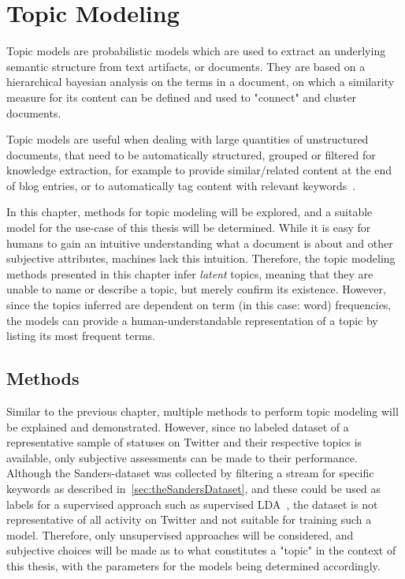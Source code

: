 \chapter{Topic Modeling}
\label{ch:topicModeling}

Topic models are probabilistic models which are used to extract an underlying semantic structure from text artifacts, or documents.
They are based on a hierarchical bayesian analysis on the terms in a document,
on which a similarity measure for its content can be defined and used to "connect" and cluster documents.

Topic models are useful when dealing with large quantities of unstructured documents,
that need to be automatically structured, grouped or filtered for knowledge extraction,
for example to provide similar/related content at the end of blog entries,
or to automatically tag content with relevant keywords~\cite{blei2009topic}.

In this chapter, methods for topic modeling will be explored,
and a suitable model for the use-case of this thesis will be determined.
While it is easy for humans to gain an intuitive understanding what a document is about
and other subjective attributes, machines lack this intuition.
Therefore, the topic modeling methods presented in this chapter infer \textit{latent} topics,
meaning that they are unable to name or describe a topic, but merely confirm its existence.
However, since the topics inferred are dependent on term (in this case: word) frequencies,
the models can provide a human-understandable representation of a topic by listing its most frequent terms.

\section{Methods}
\label{sec:methods_topicmodeling}

Similar to the previous chapter, multiple methods to perform topic modeling will be explained and demonstrated.
However, since no labeled dataset of a representative sample of statuses on Twitter and their respective topics is available,
only subjective assessments can be made to their performance.
Although the Sanders-dataset was collected by filtering a stream for specific keywords as described in~\cref{sec:theSandersDataset},
and these could be used as labels for a supervised approach such as supervised LDA~\cite{Blei2008},
the dataset is not representative of all activity on Twitter and not suitable for training such a model.
Therefore, only unsupervised approaches will be considered,
and subjective choices will be made as to what constitutes a "topic" in the context of this thesis,
with the parameters for the models being determined accordingly.

